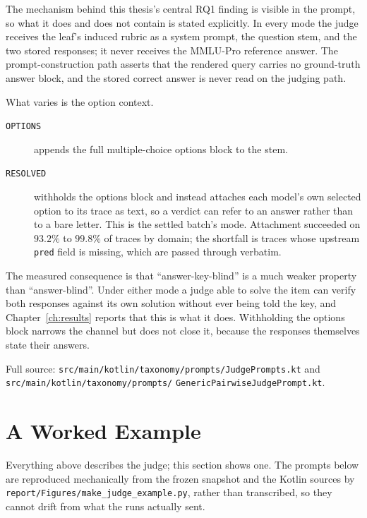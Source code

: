 The mechanism behind this thesis's central RQ1 finding is visible in the
prompt, so what it does and does not contain is stated explicitly. In every
mode the judge receives the leaf's induced rubric as a system prompt, the
question stem, and the two stored responses; it never receives the MMLU-Pro
reference answer. The prompt-construction path asserts that the rendered query
carries no ground-truth answer block, and the stored correct answer is never
read on the judging path.

What varies is the option context.

\begin{description}
\item[\texttt{OPTIONS}] appends the full multiple-choice options block to the
stem.
\item[\texttt{RESOLVED}] withholds the options block and instead attaches each
model's own selected option to its trace as text, so a verdict can refer to an
answer rather than to a bare letter. This is the settled batch's mode.
Attachment succeeded on $93.2\%$ to $99.8\%$ of traces by domain; the shortfall
is traces whose upstream \texttt{pred} field is missing, which are passed
through verbatim.
\end{description}

The measured consequence is that ``answer-key-blind'' is a much weaker property
than ``answer-blind''. Under either mode a judge able to solve the item can
verify both responses against its own solution without ever being told the key,
and Chapter~\ref{ch:results} reports that this is what it does. Withholding the
options block narrows the channel but does not close it, because the responses
themselves state their answers.

Full source: \texttt{src/main/kotlin/taxonomy/prompts/JudgePrompts.kt}
and \texttt{src/main/kotlin/taxonomy/prompts/}\allowbreak
\texttt{GenericPairwiseJudgePrompt.kt}.

\section{A Worked Example}\label{sec:judge-example}

Everything above describes the judge; this section shows one. The prompts below
are reproduced mechanically from the frozen snapshot and the Kotlin sources by
\texttt{report/Figures/make\_judge\_example.py}, rather than transcribed, so
they cannot drift from what the runs actually sent.



